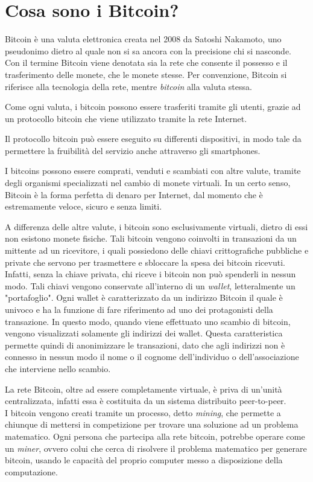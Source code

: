 \section{Cosa sono i Bitcoin?}


Bitcoin è una valuta elettronica creata nel 2008 da Satoshi Nakamoto, uno pseudonimo dietro al quale non si sa ancora con la precisione chi si nasconde.
Con il termine Bitcoin viene denotata sia la rete che consente il possesso e il trasferimento delle monete, che le monete stesse. Per convenzione, Bitcoin si riferisce alla tecnologia della rete, mentre \textit{bitcoin} alla valuta stessa.

Come ogni valuta, i bitcoin possono essere trasferiti tramite gli utenti, grazie ad un protocollo bitcoin che viene utilizzato tramite la rete Internet.

 Il protocollo bitcoin può essere eseguito su differenti dispositivi, in modo tale da permettere la fruibilità del servizio anche attraverso gli smartphones.
 
I bitcoins possono essere comprati, venduti e scambiati con altre valute, tramite degli organismi specializzati nel cambio di monete virtuali. In un certo senso, Bitcoin è la forma perfetta di denaro per Internet, dal momento che è estremamente veloce, sicuro e senza limiti.

A differenza delle altre valute, i bitcoin sono esclusivamente virtuali, dietro di essi non esistono monete fisiche. Tali bitcoin vengono coinvolti in transazioni da un mittente ad un ricevitore, i quali possiedono delle chiavi crittografiche pubbliche e private che servono per trasmettere e sbloccare la spesa dei bitcoin ricevuti.
Infatti, senza la chiave privata, chi riceve i bitcoin non può spenderli in nessun modo. Tali chiavi vengono conservate all'interno di un \textit{wallet}, letteralmente un "portafoglio". Ogni wallet è caratterizzato da un indirizzo Bitcoin il quale è univoco e ha la funzione di fare riferimento ad uno dei protagonisti della transazione. In questo modo, quando viene effettuato uno scambio di bitcoin, vengono visualizzati solamente gli indirizzi dei wallet. Questa caratteristica permette quindi di anonimizzare le transazioni, dato che agli indirizzi non è connesso in nessun modo il nome o il cognome dell'individuo o dell'associazione che interviene nello scambio.

La rete Bitcoin, oltre ad essere completamente virtuale, è priva di un'unità centralizzata, infatti essa è costituita da un sistema distribuito peer-to-peer.\\
I bitcoin vengono creati tramite un processo, detto \textit{mining}, che permette a chiunque di mettersi in competizione per trovare una soluzione ad un problema matematico. Ogni persona che partecipa alla rete bitcoin, potrebbe operare come un \textit{miner}, ovvero colui che cerca di risolvere il problema matematico per generare bitcoin, usando le capacità del proprio computer messo a disposizione della computazione.\\

